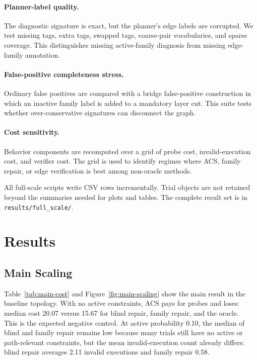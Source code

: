 \documentclass{article}
\newcommand{\ACS}{\textsc{ACS}}
\begin{document}
\paragraph{Planner-label quality.}
The diagnostic signature is exact, but the planner's edge labels are corrupted. We test missing tags, extra tags, swapped tags, coarse-pair vocabularies, and sparse coverage. This distinguishes missing active-family diagnosis from missing edge-family annotation.

\paragraph{False-positive completeness stress.}
Ordinary false positives are compared with a bridge false-positive construction in which an inactive family label is added to a mandatory layer cut. This suite tests whether over-conservative signatures can disconnect the graph.

\paragraph{Cost sensitivity.}
Behavior components are recomputed over a grid of probe cost, invalid-execution cost, and verifier cost. The grid is used to identify regimes where \ACS{}, family repair, or edge verification is best among non-oracle methods.

All full-scale scripts write CSV rows incrementally. Trial objects are not retained beyond the summaries needed for plots and tables. The complete result set is in \texttt{results/full\_scale/}.

\section{Results}

\subsection{Main Scaling}

Table~\ref{tab:main-cost} and Figure~\ref{fig:main-scaling} show the main result in the baseline topology. With no active constraints, \ACS{} pays for probes and loses: median cost 20.07 versus 15.67 for blind repair, family repair, and the oracle. This is the expected negative control. At active probability 0.10, the median of blind and family repair remains low because many trials still have no active or path-relevant constraints, but the mean invalid-execution count already differs: blind repair averages 2.11 invalid executions and family repair 0.58.
\end{document}
